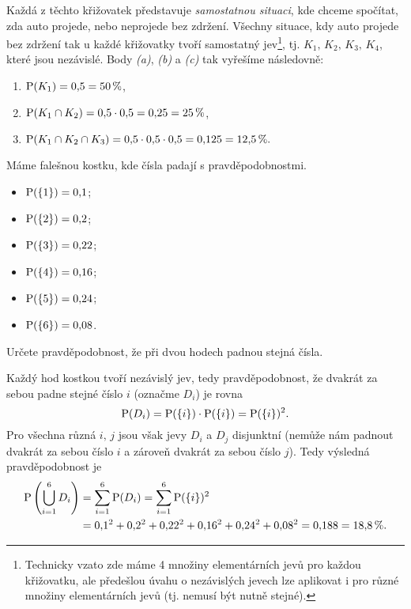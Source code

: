 \begin{solution}
    Každá z těchto křižovatek představuje \emph{samostatnou situaci}, kde chceme spočítat, zda auto projede, nebo neprojede bez zdržení. Všechny situace, kdy auto projede bez zdržení tak u každé křižovatky tvoří samostatný jev\footnote{Technicky vzato zde máme 4 množiny elementárních jevů pro každou křižovatku, ale předešlou úvahu o nezávislých jevech lze aplikovat i pro různé množiny elementárních jevů (tj. nemusí být nutně stejné).}, tj. $K_1,\,K_2,\,K_3,\,K_4$, které jsou nezávislé. Body \textit{(a)}, \textit{(b)} a \textit{(c)} tak vyřešíme následovně:
    \begin{enumerate}[label=(\alph*)]
        \item $\displaystyle \operatorname{\text{P}}(K_1)=0{,}5=50\,\%$,
        \item $\displaystyle \operatorname{\text{P}}(K_1\cap K_2)=0{,}5\cdot 0{,}5=0{,}25=25\,\%$,
        \item $\displaystyle \operatorname{\text{P}}(K_1\cap K_2\cap K_3)=0{,}5\cdot 0{,}5\cdot 0{,}5=0{,}125=12{,}5\,\%.$
    \end{enumerate}
\end{solution}
\begin{task}
    Máme falešnou kostku, kde čísla padají s pravděpodobnostmi.
    \begin{itemize}
        \item $\operatorname{\text{P}}(\left\{1\right\})=0{,}1$;
        \item $\operatorname{\text{P}}(\left\{2\right\})=0{,}2$;
        \item $\operatorname{\text{P}}(\left\{3\right\})=0{,}22$;
        \item $\operatorname{\text{P}}(\left\{4\right\})=0{,}16$;
        \item $\operatorname{\text{P}}(\left\{5\right\})=0{,}24$;
        \item $\operatorname{\text{P}}(\left\{6\right\})=0{,}08$.
    \end{itemize}
    Určete pravděpodobnost, že při dvou hodech padnou stejná čísla. \citep[příklad \textit{Falešná kostka
    }]{hackmath2022}
\end{task}
\begin{solution}
    Každý hod kostkou tvoří nezávislý jev, tedy pravděpodobnost, že dvakrát za sebou padne stejné číslo $i$ (označme $D_i$) je rovna
    \[\operatorname{\text{P}}(D_i)=\operatorname{\text{P}}(\left\{i\right\})\cdot\operatorname{\text{P}}(\left\{i\right\})=\operatorname{\text{P}}(\left\{i\right\})^2.\]
    Pro všechna různá $i,\,j$ jsou však jevy $D_i$ a $D_j$ disjunktní (nemůže nám padnout dvakrát za sebou číslo $i$ a zároveň dvakrát za sebou číslo $j$). Tedy výsledná pravděpodobnost je
    \begin{align*}
        \operatorname{\text{P}}\left(\bigcup\limits_{i=1}^{6}D_i\right)&=\sum_{i=1}^{6}\operatorname{\text{P}}(D_i)=\sum_{i=1}^{6}\operatorname{\text{P}}(\left\{i\right\})^2\\
        &=0{,}1^2+0{,}2^2+0{,}22^2+0{,}16^2+0{,}24^2+0{,}08^2=0{,}188=18{,}8\,\%.
    \end{align*}
\end{solution}
